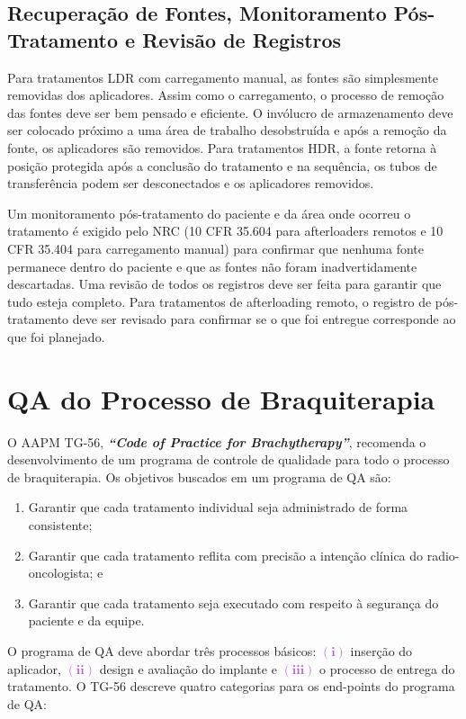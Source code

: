 \documentclass[11pt,a4paper]{article}
\begin{document}
\subsection*{Recuperação de Fontes, Monitoramento Pós-Tratamento e Revisão de Registros}

	Para tratamentos LDR com carregamento manual, as fontes são simplesmente removidas dos aplicadores. Assim como o carregamento, o processo de remoção das fontes deve ser bem pensado e eficiente. O invólucro de armazenamento deve ser colocado próximo a uma área de trabalho desobstruída e após a remoção da fonte, os aplicadores são removidos. Para tratamentos HDR, a fonte retorna à posição protegida após a conclusão do tratamento e na sequência, os tubos de transferência podem ser desconectados e os aplicadores removidos.

	Um monitoramento pós-tratamento do paciente e da área onde ocorreu o tratamento é exigido pelo NRC (10 CFR 35.604 para afterloaders remotos e 10 CFR 35.404 para carregamento manual) para confirmar que nenhuma fonte permanece dentro do paciente e que as fontes não foram inadvertidamente descartadas. Uma revisão de todos os registros deve ser feita para garantir que tudo esteja completo. Para tratamentos de afterloading remoto, o registro de pós-tratamento deve ser revisado para confirmar se o que foi entregue corresponde ao que foi planejado.

\section{QA do Processo de Braquiterapia}

	O AAPM TG-56, \textit{\textbf{``Code of Practice for Brachytherapy''}}, recomenda o desenvolvimento de um programa de controle de qualidade para todo o processo de braquiterapia. Os objetivos buscados em um programa de QA são:

	\begin{enumerate}
		\item Garantir que cada tratamento individual seja administrado de forma consistente;
		\item Garantir que cada tratamento reflita com precisão a intenção clínica do radio-oncologista; e
		\item Garantir que cada tratamento seja executado com respeito à segurança do paciente e da equipe.
	\end{enumerate}

	O programa de QA deve abordar três processos básicos: \textcolor{MediumOrchid}{$\mathbf{(i)}$} inserção do aplicador, \textcolor{MediumOrchid}{$\mathbf{(ii)}$} design e avaliação do implante e \textcolor{MediumOrchid}{$\mathbf{(iii)}$} o processo de entrega do tratamento. O TG-56 descreve quatro categorias para os end-points do programa de QA:
\end{document}
